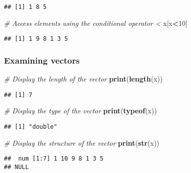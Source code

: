 \documentclass[
]{article}
\newenvironment{Shaded}{\begin{snugshade}}{\end{snugshade}}
\newcommand{\CommentTok}[1]{\textcolor[rgb]{0.56,0.35,0.01}{\textit{#1}}}
\newcommand{\DecValTok}[1]{\textcolor[rgb]{0.00,0.00,0.81}{#1}}
\newcommand{\FunctionTok}[1]{\textcolor[rgb]{0.13,0.29,0.53}{\textbf{#1}}}
\newcommand{\NormalTok}[1]{#1}
\newcommand{\SpecialCharTok}[1]{\textcolor[rgb]{0.81,0.36,0.00}{\textbf{#1}}}
\begin{document}
\begin{verbatim}
## [1] 1 8 5
\end{verbatim}

\begin{Shaded}
\begin{Highlighting}[]
\CommentTok{\# Access elements using the conditional operator \textless{}}
\NormalTok{x[x}\SpecialCharTok{\textless{}}\DecValTok{10}\NormalTok{]}
\end{Highlighting}
\end{Shaded}

\begin{verbatim}
## [1] 1 9 8 1 3 5
\end{verbatim}

\hypertarget{examining-vectors}{%
\subsubsection{Examining vectors}\label{examining-vectors}}

\begin{Shaded}
\begin{Highlighting}[]
\CommentTok{\# Display the length of the vector}
\FunctionTok{print}\NormalTok{(}\FunctionTok{length}\NormalTok{(x))}
\end{Highlighting}
\end{Shaded}

\begin{verbatim}
## [1] 7
\end{verbatim}

\begin{Shaded}
\begin{Highlighting}[]
\CommentTok{\# Display the type of the vector}
\FunctionTok{print}\NormalTok{(}\FunctionTok{typeof}\NormalTok{(x))}
\end{Highlighting}
\end{Shaded}

\begin{verbatim}
## [1] "double"
\end{verbatim}

\begin{Shaded}
\begin{Highlighting}[]
\CommentTok{\# Display the structure of the vector}
\FunctionTok{print}\NormalTok{(}\FunctionTok{str}\NormalTok{(x))}
\end{Highlighting}
\end{Shaded}

\begin{verbatim}
##  num [1:7] 1 10 9 8 1 3 5
## NULL
\end{verbatim}
\end{document}
